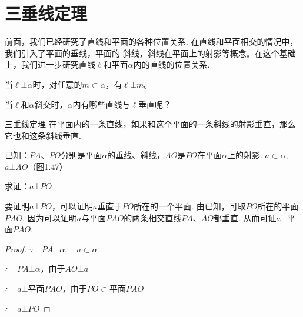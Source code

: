 
\section{三垂线定理}
前面，我们已经研究了直线和平面的各种位置关系. 在直线和平面相交的情况中，我们引入了平面的垂线，平面的
斜线，斜线在平面上的射影等概念。在这个基础上，我们进一步研究直线$\ell$和平面$\alpha$内的直线的位置关系.

当$\ell\bot\alpha$时，对任意的$m\subset\alpha$，有$\ell\bot m$。

当$\ell$和$\alpha$斜交时，$\alpha$内有哪些直线与$\ell$垂直呢？

\begin{thm}
  {三垂线定理} 在平面内的一条直线，如果和这个平面的一条斜线的射影垂直，那么它也和这条斜线垂直.  
\end{thm}

已知：$PA$、$PO$分别是平面$\alpha$的垂线、斜线，$AO$是$PO$在平面$\alpha$上的射影. $a\subset\alpha$, $a\bot AO$（图1.47）

求证：$a\bot PO$

\noindent
\begin{minipage}{.6\textwidth}\CTEXindent
\begin{analyze}
要证明$a\bot PO$，可以证明$a$垂直于$PO$所在的一个平面. 由已知，可取$PO$所在的平面$PAO$. 因为可以证明$a$与平面$PAO$的两条相交直线$PA$、$AO$都垂直. 从而可证$a\bot $平面$PAO$.
\end{analyze}

\begin{proof}
$\because\quad PA\bot \alpha,\quad a\subset\alpha$

$\therefore\quad PA\bot\alpha$，由于$AO\bot a$

$\therefore\quad a\bot$平面$PAO$，由于$PO\subset $平面$PAO$

$\therefore\quad a\bot PO$
\end{proof}
\end{minipage}
\hfill
\begin{minipage}{.38\textwidth}
\centering
{}
\end{minipage}

